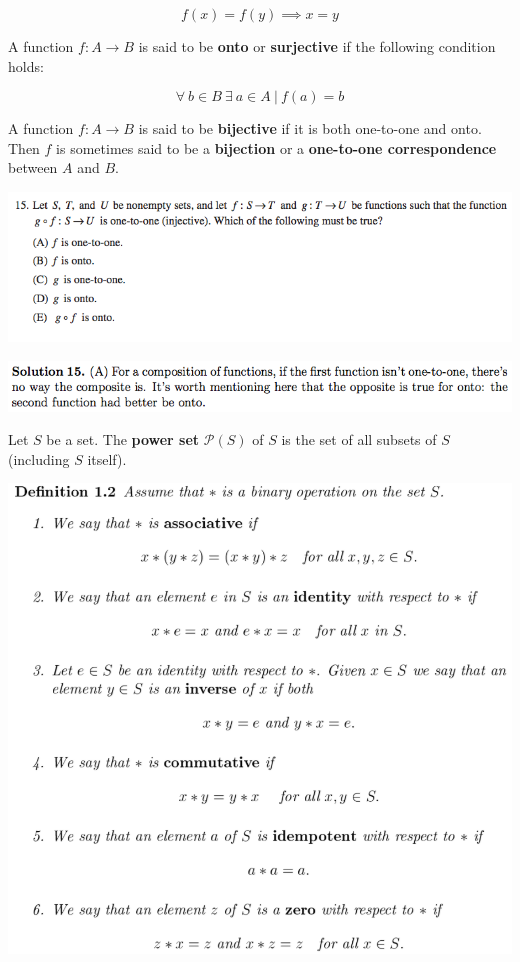 \documentclass{article}
\begin{document}
\[
f(x) = f(y) \implies x = y
\]

A function \(f: A \to B\) is said to be \textbf{onto} or \textbf{surjective} if the following condition holds:

\[
\forall \ b \in B \ \exists \ a \in A \ | \ f(a) = b
\]

A function \(f: A \to B\) is said to be \textbf{bijective} if it is both one-to-one and onto. Then \(f\) is sometimes said to be a \textbf{bijection} or a \textbf{one-to-one correspondence} between \(A\) and \(B\).

\includegraphics[scale=0.65]{1268_15}

\includegraphics[scale=0.65]{1268_15s}

Let \(S\) be a set. The \textbf{power set} \(\mathcal{P}(S)\) of \(S\) is the set of all subsets of \(S\) (including \(S\) itself).

\includegraphics[scale=0.45]{binary_operation2}
\end{document}
